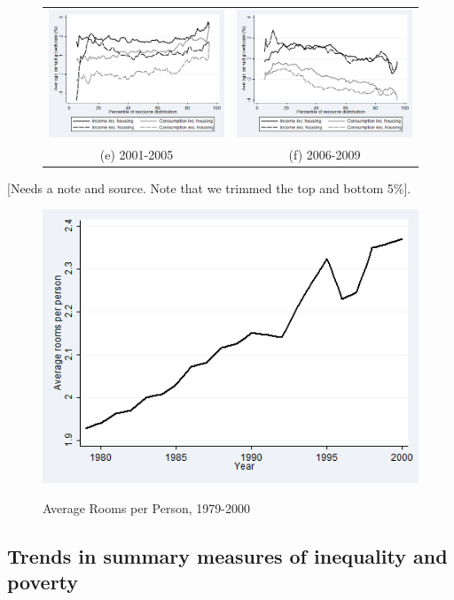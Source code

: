 \begin{figure}
\begin{tabular}{cc}
\includegraphics[width=.5\linewidth]{pictures/gic_5.png} & \includegraphics[width=.5\linewidth]{pictures/gic_6.png} \\
(e) 2001-2005 & (f) 2006-2009
\end{tabular}
\label{fig:gicsub}
\end{figure}

[Needs a note and source. Note that we trimmed the top and bottom 5\%].


\begin{figure}
\caption{Average Rooms per Person, 1979-2000}
\centering
\includegraphics[width=0.7\linewidth]{pictures/rooms_pp.png}
\label{fig:room_time}
\end{figure}



\subsection{Trends in summary measures of inequality and poverty}

